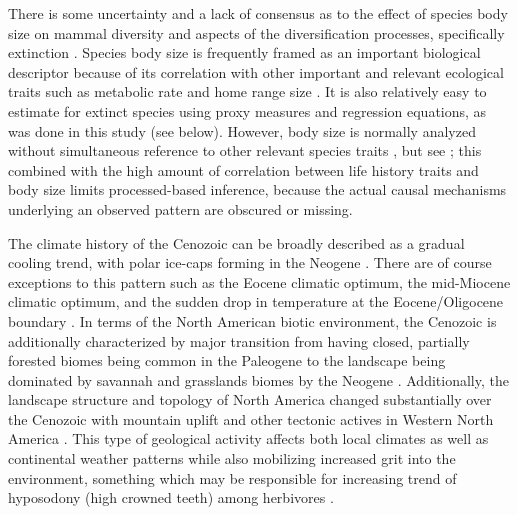 \documentclass[12pt,letterpaper]{article}
\begin{document}
There is some uncertainty and a lack of consensus as to the effect of species body size on mammal diversity and aspects of the diversification processes, specifically extinction \citep{Liow2008,Liow2009,Tomiya2013,Smits2015b}. Species body size is frequently framed as an important biological descriptor because of its correlation with other important and relevant ecological traits such as metabolic rate and home range size \citep{Brown1995}. It is also relatively easy to estimate for extinct species using proxy measures and regression equations, as was done in this study (see below). However, body size is normally analyzed without simultaneous reference to other relevant species traits \citep{Liow2008,Huang2017,Raia2012f,Smith2004}, but see \citep{Smits2015b}; this combined with the high amount of correlation between life history traits and body size limits processed-based inference, because the actual causal mechanisms underlying an observed pattern are obscured or missing.

The climate history of the Cenozoic can be broadly described as a gradual cooling trend, with polar ice-caps forming in the Neogene \citep{Zachos2001,Zachos2008,Cramer2011}. There are of course exceptions to this pattern such as the Eocene climatic optimum, the mid-Miocene climatic optimum, and the sudden drop in temperature at the Eocene/Oligocene boundary \citep{Zachos2001,Zachos2008}. In terms of the North American biotic environment, the Cenozoic is additionally characterized by major transition from having closed, partially forested biomes being common in the Paleogene to the landscape being dominated by savannah and grasslands biomes by the Neogene \citep{Blois2009,Janis1993b,Janis2000,Stromberg2005}. Additionally, the landscape structure and topology of North America changed substantially over the Cenozoic with mountain uplift and other tectonic actives in Western North America \citep{Blois2009,Eronen2015,Janis2008a,Badgley2013}. This type of geological activity affects both local climates as well as continental weather patterns while also mobilizing increased grit into the environment, something which may be responsible for increasing trend of hyposodony (high crowned teeth) among herbivores \citep{Jardine2012,Jernvall2002,Damuth2011}.
\end{document}
